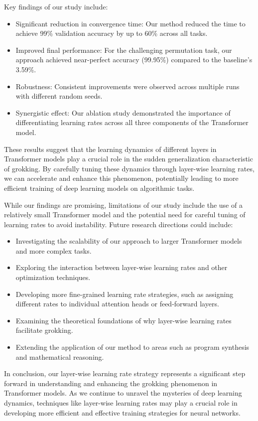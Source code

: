 \documentclass{article} %
\begin{document}
Key findings of our study include:

\begin{itemize}
    \item Significant reduction in convergence time: Our method reduced the time to achieve 99\% validation accuracy by up to 60\% across all tasks.
    \item Improved final performance: For the challenging permutation task, our approach achieved near-perfect accuracy (99.95\%) compared to the baseline's 3.59\%.
    \item Robustness: Consistent improvements were observed across multiple runs with different random seeds.
    \item Synergistic effect: Our ablation study demonstrated the importance of differentiating learning rates across all three components of the Transformer model.
\end{itemize}

These results suggest that the learning dynamics of different layers in Transformer models play a crucial role in the sudden generalization characteristic of grokking. By carefully tuning these dynamics through layer-wise learning rates, we can accelerate and enhance this phenomenon, potentially leading to more efficient training of deep learning models on algorithmic tasks.

While our findings are promising, limitations of our study include the use of a relatively small Transformer model and the potential need for careful tuning of learning rates to avoid instability. Future research directions could include:

\begin{itemize}
    \item Investigating the scalability of our approach to larger Transformer models and more complex tasks.
    \item Exploring the interaction between layer-wise learning rates and other optimization techniques.
    \item Developing more fine-grained learning rate strategies, such as assigning different rates to individual attention heads or feed-forward layers.
    \item Examining the theoretical foundations of why layer-wise learning rates facilitate grokking.
    \item Extending the application of our method to areas such as program synthesis and mathematical reasoning.
\end{itemize}

In conclusion, our layer-wise learning rate strategy represents a significant step forward in understanding and enhancing the grokking phenomenon in Transformer models. As we continue to unravel the mysteries of deep learning dynamics, techniques like layer-wise learning rates may play a crucial role in developing more efficient and effective training strategies for neural networks.



\end{document}
